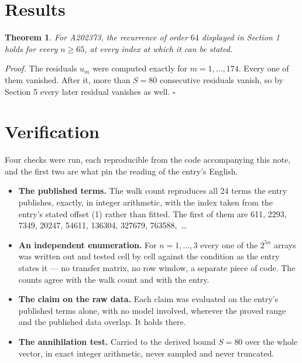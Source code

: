 \documentclass[11pt]{article}
\newtheorem{theorem}{Theorem}
\theoremstyle{definition}
\begin{document}
\section{Results}

\begin{theorem} For A202373, the recurrence of order $64$ displayed in Section 1 holds for every $n \ge 65$, at every index at which it can be stated.\end{theorem}

{\itshape Proof.} The residuals $u_m$ were computed exactly for $m = 1,\dots,174$. Every one of them vanished. After it, more than $S = 80$ consecutive residuals vanish, so by Section 5 every later residual vanishes as well. $\square$

\section{Verification}

Four checks were run, each reproducible from the code accompanying this note, and the first two are what pin the reading of the entry's English.

\begin{itemize}

\item {\bfseries The published terms.} The walk count reproduces all 24 terms the entry publishes, exactly, in integer arithmetic, with the index taken from the entry's stated offset (1) rather than fitted. The first of them are 611, 2293, 7349, 20247, 54611, 136304, 327679, 763588,~\dots

\item {\bfseries An independent enumeration.} For $n = 1,\dots,3$ every one of the $2^{5n}$ arrays was written out and tested cell by cell against the condition as the entry states it --- no transfer matrix, no row window, a separate piece of code. The counts agree with the walk count and with the entry.

\item {\bfseries The claim on the raw data.} Each claim was evaluated on the entry's published terms alone, with no model involved, wherever the proved range and the published data overlap. It holds there.

\item {\bfseries The annihilation test.} Carried to the derived bound $S = 80$ over the whole vector, in exact integer arithmetic, never sampled and never truncated.

\end{itemize}
\end{document}
